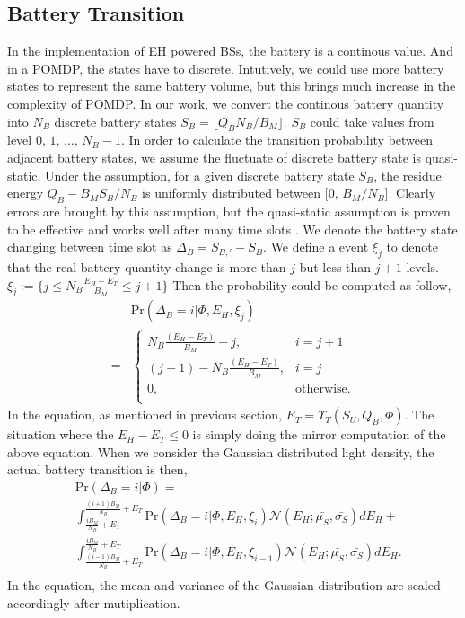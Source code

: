 \documentclass[conference]{IEEEtran}
\begin{document}
\subsection{Battery Transition}
In the implementation of EH powered BSs, the battery is a continous value.
And in a POMDP, the states have to discrete.
Intutively, we could use more battery states to represent the same battery volume,
but this brings much increase in the complexity of POMDP.
In our work, we convert the continous battery quantity into \(N_B\) discrete battery states
\(S_B = \lfloor Q_B N_B / B_M \rfloor\). \(S_B\) could take values from level \(0,\,1,\,...,\,N_B - 1\).
In order to calculate the transition probability between adjacent battery states,
we assume the fluctuate of discrete battery state is quasi-static.
Under the assumption, for a given discrete battery state \(S_B\),
the residue energy \(Q_B - B_MS_B/N_B\) is uniformly distributed between \(\lbrack0,\,B_M/N_B\rbrack\).
Clearly errors are brought by this assumption,
but the quasi-static assumption is proven to be effective
and works well after many time slots \cite{data}.
We denote the battery state changing between time slot as \(\Delta_B = S_{B,'} - S_B\).
We define a event \(\xi_j\) to denote that the real battery quantity change is more than \(j\) but less than \(j+1\) levels.
\(\xi_j := \{j\leq N_B\frac{E_H - E_T}{B_M} \le j+1\}\)
Then the probability could be computed as follow,
\begin{align}&\mbox{Pr}\left(\Delta_B = i |\Phi, E_H, \xi_j \right)\nonumber\\
=&\begin{cases} N_B\frac{\left(E_H - E_T\right)}{B_M} -j, &\mbox{$i = j + 1$}\\
\left(j+1\right) -N_B\frac{\left(E_H - E_T\right)} {B_M}, &\mbox{$i = j$}\\
0, &\mbox{otherwise.}\\
\end{cases}
\end{align}
In the equation, as mentioned in previous section, \(E_T = \Upsilon_T(S_U, Q_B, \Phi)\).
The situation where the \(E_H - E_T \le 0\) is simply doing the mirror computation of the above equation.
When we consider the Gaussian distributed light density, the actual battery transition is then,
\begin{equation}\label{battery}
\begin{aligned}
	&\mbox{Pr}\left(\Delta_B = i |\Phi\right) = \\
	&\int_{\frac{iB_M}{N_B} + E_T}^{\frac{\left(i+1\right)B_M}{N_B} + E_T}
	\mbox{Pr}\left(\Delta_B = i |\Phi, E_H, \xi_i\right) \mathcal{N}\left(E_H;\bar{\mu_S},\bar{\sigma_S}\right) dE_H+\\
	& \int_{\frac{\left(i-1\right)B_M}{N_B} + E_T}^{\frac{iB_M}{N_B} + E_T}
	\mbox{Pr}\left(\Delta_B = i |\Phi, E_H, \xi_{i-1}\right) \mathcal{N}\left(E_H;\bar{\mu_S},\bar{\sigma_S}\right) dE_H.\\
\end{aligned}
\end{equation}
In the equation, the mean and variance of the Gaussian distribution are scaled accordingly after mutiplication.
\end{document}
